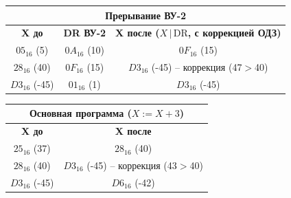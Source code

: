 \documentclass[12pt,a4paper]{article}
\begin{document}
\begin{table}[h!]
\centering
\small
\begin{tabular}{|c|c|c|}
\hline
\multicolumn{3}{|c|}{\textbf{Прерывание ВУ-2}} \\
\hline
\textbf{X до} & \textbf{DR ВУ-2} & \textbf{X после ($X\,|\,\text{DR}$, с коррекцией ОДЗ)} \\
\hline
$05_{16}$ (5) & $0A_{16}$ (10) & $0F_{16}$ (15) \\
$28_{16}$ (40) & $0F_{16}$ (15) & $D3_{16}$ (-45) -- коррекция (47$>$40) \\
$D3_{16}$ (-45) & $01_{16}$ (1) & $D3_{16}$ (-45) \\
\hline
\end{tabular}
\end{table}

\begin{table}[h!]
\centering
\small
\begin{tabular}{|c|c|}
\hline
\multicolumn{2}{|c|}{\textbf{Основная программа ($X:=X+3$)}} \\
\hline
\textbf{X до} & \textbf{X после} \\
\hline
$25_{16}$ (37) & $28_{16}$ (40) \\
$28_{16}$ (40) & $D3_{16}$ (-45) -- коррекция (43$>$40) \\
$D3_{16}$ (-45) & $D6_{16}$ (-42) \\
\hline
\end{tabular}
\end{table}
\end{document}
